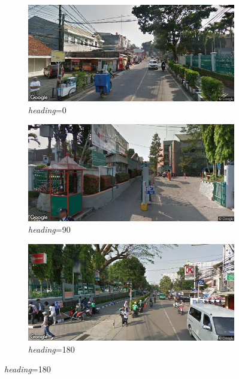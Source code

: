 \begin{figure}[]
	\begin{subfigure}{.5\textwidth}
  		\centering
  		\includegraphics[width=1\linewidth]{Gambar/streetview0.png}
  		\caption{\textit{heading}=0}
  		\label{fig:streetview0}
	\end{subfigure}
	\begin{subfigure}{.5\textwidth}
  		\centering
  		\includegraphics[width=1\linewidth]{Gambar/streetview90.png}
  		\caption{\textit{heading}=90}
  		\label{fig:streetview90}
	\end{subfigure}
	\begin{subfigure}{.5\textwidth}
  		\centering
  		\includegraphics[width=1\linewidth]{Gambar/streetview180.png}
  		\caption{\textit{heading}=180}

\end{subfigure}
\end{figure}
